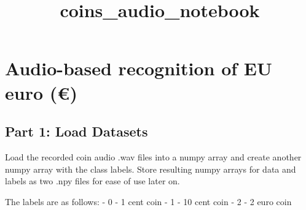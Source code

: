 \documentclass[11pt]{article}
\title{coins\_audio\_notebook}
\begin{document}
    
    
    \maketitle
    
    

    
    \section{Audio-based recognition of EU euro
(\euro{})}\label{audio-based-recognition-of-eu-euro}

    \subsection{Part 1: Load Datasets}\label{part-1-load-datasets}

Load the recorded coin audio .wav files into a numpy array and create
another numpy array with the class labels. Store resulting numpy arrays
for data and labels as two .npy files for ease of use later on.

The labels are as follows: - 0 - 1 cent coin - 1 - 10 cent coin - 2 - 2
euro coin
\end{document}
